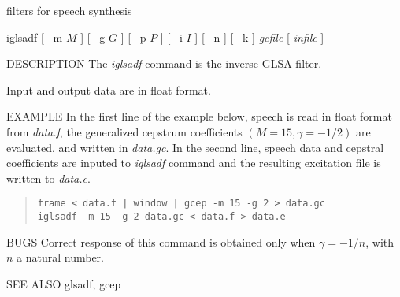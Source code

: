 %
{filters for speech synthesis}

\begin{synopsis}
\item [iglsadf] [ --m $M$ ] [ --g $G$ ] [ --p $P$ ] [ --i $I$ ]
	  	[ --n ] [ --k ] {\em gcfile}  [ {\em infile} ] 
\end{synopsis}

\begin{qsection}{DESCRIPTION}
The {\em iglsadf} command is the inverse GLSA filter.
\par
Input and output data are in float format.

\end{qsection}

\begin{options}
\end{options}

\begin{qsection}{EXAMPLE}
In the first line of the example below, 
speech is read in float format from {\em data.f},
the generalized cepstrum coefficients $(M=15,\gamma = -1/2)$
are evaluated, and written in {\em data.gc}.
In the second line,
speech data and cepstral coefficients are
inputed to {\em iglsadf} command and the resulting excitation file
is written to {\em data.e}.
\begin{quote}
 \verb!frame < data.f | window | gcep -m 15 -g 2 > data.gc!\\
 \verb!iglsadf -m 15 -g 2 data.gc < data.f > data.e!
\end{quote}
\end{qsection}

\begin{qsection}{BUGS}
Correct response of this command is obtained only when
$\gamma = -1/n$, with $n$ a natural number.
\end{qsection}
\begin{qsection}{SEE ALSO}
glsadf, gcep
\end{qsection}
